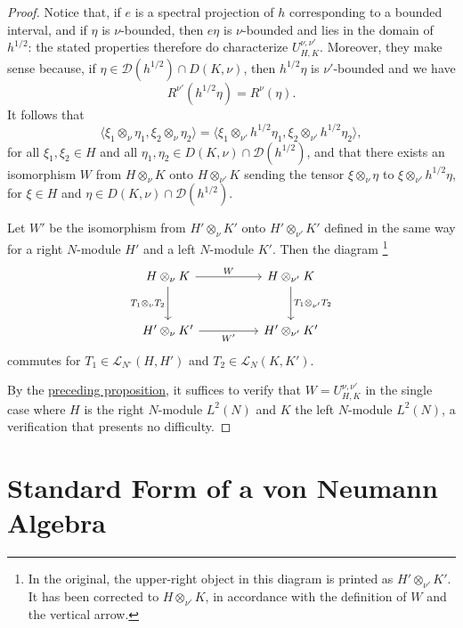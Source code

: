 \documentclass[fontsize=13pt,twoside,headings=small,bookmarkpackage=false]{scrartcl}
\newcommand{\Lop}{\mathcal L}
\newcommand{\ip}[2]{\langle #1,#2\rangle}
\newcounter{translatornote}
\newcommand{\tfnote}[1]{\stepcounter{translatornote}\begingroup
  \renewcommand{\thefootnote}{T\arabic{translatornote}}\footnote{#1}\endgroup}
\begin{document}
\begin{proof}
Notice that, if $e$ is a spectral projection of $h$ corresponding to a bounded interval, and if $\eta$ is $\nu$-bounded, then $e\eta$ is $\nu$-bounded and lies in the domain of $h^{1/2}$: the stated properties therefore do characterize $U_{H,K}^{\nu,\nu'}$. Moreover, they make sense because, if $\eta\in\mathcal D(h^{1/2})\cap D(K,\nu)$, then $h^{1/2}\eta$ is $\nu'$-bounded and we have
\[
R^{\nu'}(h^{1/2}\eta)=R^\nu(\eta).
\]
It follows that
\[
\ip{\xi_1\otimes_\nu\eta_1}{\xi_2\otimes_\nu\eta_2}
=\ip{\xi_1\otimes_{\nu'}h^{1/2}\eta_1}{\xi_2\otimes_{\nu'}h^{1/2}\eta_2},
\]
for all $\xi_1,\xi_2\in H$ and all $\eta_1,\eta_2\in D(K,\nu)\cap\mathcal D(h^{1/2})$, and that there exists an isomorphism $W$ from $H\otimes_\nu K$ onto $H\otimes_{\nu'}K$ sending the tensor $\xi\otimes_\nu\eta$ to $\xi\otimes_{\nu'}h^{1/2}\eta$, for $\xi\in H$ and $\eta\in D(K,\nu)\cap\mathcal D(h^{1/2})$.

Let $W'$ be the isomorphism from $H'\otimes_\nu K'$ onto $H'\otimes_{\nu'}K'$ defined in the same way for a right $N$-module $H'$ and a left $N$-module $K'$. Then the diagram\tfnote{In the original, the upper-right object in this diagram is printed as $H'\otimes_{\nu'}K'$. It has been corrected to $H\otimes_{\nu'}K$, in accordance with the definition of $W$ and the vertical arrow.}
\[
\begin{tikzcd}[column sep=huge,row sep=large]
H\otimes_\nu K\arrow[r,"W"]\arrow[d,"T_1\otimes_\nu T_2"']
&H\otimes_{\nu'}K\arrow[d,"T_1\otimes_{\nu'}T_2"]\\
H'\otimes_\nu K'\arrow[r,"W'"']&H'\otimes_{\nu'}K'
\end{tikzcd}
\]
commutes for $T_1\in\Lop_{N^\circ}(H,H')$ and $T_2\in\Lop_N(K,K')$.

By the \hyperref[p:2.6]{preceding proposition}, it suffices to verify that $W=U_{H,K}^{\nu,\nu'}$ in the single case where $H$ is the right $N$-module $L^2(N)$ and $K$ the left $N$-module $L^2(N)$, a verification that presents no difficulty.
\end{proof}


\section{Standard Form of a von Neumann Algebra}\label{sec:3}
\end{document}
